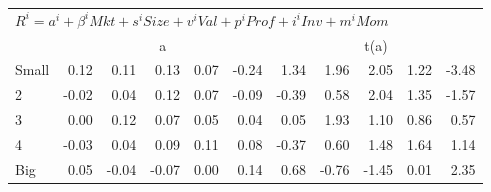 \begin{tabular}{lrrrrrrrrrr}
  \midrule
  \multicolumn{11}{l}{$R^i=a^i+\beta^iMkt+s^iSize+v^iVal+p^iProf+i^iInv+m^iMom$}  \\
  
     & \multicolumn{5}{c}{a} & \multicolumn{5}{c}{t(a)}   \\
     \cmidrule(r){2-6} \cmidrule(r){7-11} 
    Small  & 0.12  & 0.11  & 0.13  & 0.07  & -0.24  & 1.34  & 1.96  & 2.05  & 1.22  & -3.48   \\
    2  & -0.02  & 0.04  & 0.12  & 0.07  & -0.09  & -0.39  & 0.58  & 2.04  & 1.35  & -1.57   \\
    3  & 0.00  & 0.12  & 0.07  & 0.05  & 0.04  & 0.05  & 1.93  & 1.10  & 0.86  & 0.57   \\
    4  & -0.03  & 0.04  & 0.09  & 0.11  & 0.08  & -0.37  & 0.60  & 1.48  & 1.64  & 1.14   \\
    Big  & 0.05  & -0.04  & -0.07  & 0.00  & 0.14  & 0.68  & -0.76  & -1.45  & 0.01  & 2.35   \\

  \bottomrule
\end{tabular}

